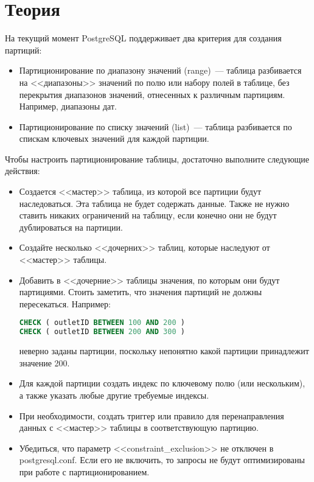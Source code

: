 \section{Теория}
На текущий момент PostgreSQL поддерживает два критерия для создания партиций:
\begin{itemize}
\item Партиционирование по диапазону значений (range)~--- таблица разбивается на <<диапазоны>> значений по полю или набору полей 
в таблице, без перекрытия диапазонов значений, отнесенных к различным партициям. Например, диапазоны дат.
\item Партиционирование по списку значений (list)~--- таблица разбивается по спискам ключевых значений для каждой партиции.
\end{itemize}

Чтобы настроить партиционирование таблицы, достаточно выполните следующие действия:
\begin{itemize}
\item Создается <<мастер>> таблица, из которой все партиции будут наследоваться. Эта таблица не будет содержать данные. 
Также не нужно ставить никаких ограничений на таблицу, если конечно они не будут дублироваться на партиции.
\item Создайте несколько <<дочерних>> таблиц, которые наследуют от <<мастер>> таблицы. 
\item Добавить в <<дочерние>> таблицы значения, по которым они будут партициями. 
Стоить заметить, что значения партиций не должны пересекаться. Например:
\begin{lstlisting}[language=SQL,label=lst:partitioning1,caption=Пример неверного задания значений партиций]
CHECK ( outletID BETWEEN 100 AND 200 )
CHECK ( outletID BETWEEN 200 AND 300 )
\end{lstlisting}
неверно заданы партиции, поскольку непонятно какой партиции принадлежит значение 200. 
\item Для каждой партиции создать индекс по ключевому полю (или нескольким), а также указать любые другие требуемые индексы.
\item При необходимости, создать триггер или правило для перенаправления данных с <<мастер>> таблицы в соответствующую партицию.
\item Убедиться, что параметр <<constraint\_exclusion>> не отключен в postgresql.conf. Если его не включить, то запросы не будут 
оптимизированы при работе с партиционированием.
\end{itemize}


